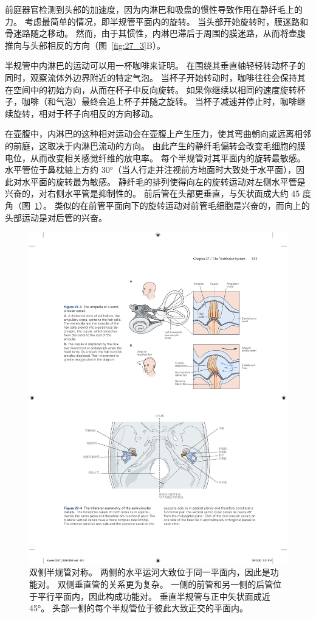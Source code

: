 前庭器官检测到头部的加速度，因为内淋巴和吸盘的惯性导致作用在静纤毛上的力。
考虑最简单的情况，即半规管平面内的旋转。
当头部开始旋转时，膜迷路和骨迷路随之移动。
然而，由于其惯性，内淋巴滞后于周围的膜迷路，从而将壶腹推向与头部相反的方向（图~\ref{fig:27_3}B）。


半规管中内淋巴的运动可以用一杯咖啡来证明。
在围绕其垂直轴轻轻转动杯子的同时，观察流体外边界附近的特定气泡。
当杯子开始转动时，咖啡往往会保持其在空间中的初始方向，从而在杯子中反向旋转。
如果你继续以相同的速度旋转杯子，咖啡（和气泡）最终会追上杯子并随之旋转。
当杯子减速并停止时，咖啡继续旋转，相对于杯子向相反的方向移动。


在壶腹中，内淋巴的这种相对运动会在壶腹上产生压力，使其弯曲朝向或远离相邻的前庭，这取决于内淋巴流动的方向。
由此产生的静纤毛偏转会改变毛细胞的膜电位，从而改变相关感觉纤维的放电率。
每个半规管对其平面内的旋转最敏感。
水平管位于鼻枕轴上方约 30°（当人行走并注视前方地面时大致处于水平面），因此对水平面的旋转最为敏感。
静纤毛的排列使得向左的旋转运动对左侧水平管是兴奋的，对右侧水平管是抑制性的。
前后管在头部更垂直，与矢状面成大约 45 度角（图~\ref{fig:27_4}）。 
类似的在前管平面向下的旋转运动对前管毛细胞是兴奋的，而向上的头部运动是对后管的兴奋。


\begin{figure}[htbp]
	\centering
	\includegraphics[width=0.75\linewidth]{chap27/fig_27_4}
	\caption{双侧半规管对称。
		两侧的水平运河大致位于同一平面内，因此是功能对。
		双侧垂直管的关系更为复杂。
		一侧的前管和另一侧的后管位于平行平面内，因此构成功能对。
		垂直半规管与正中矢状面成近 45°。
		头部一侧的每个半规管位于彼此大致正交的平面内。}
	\label{fig:27_4}
\end{figure}


